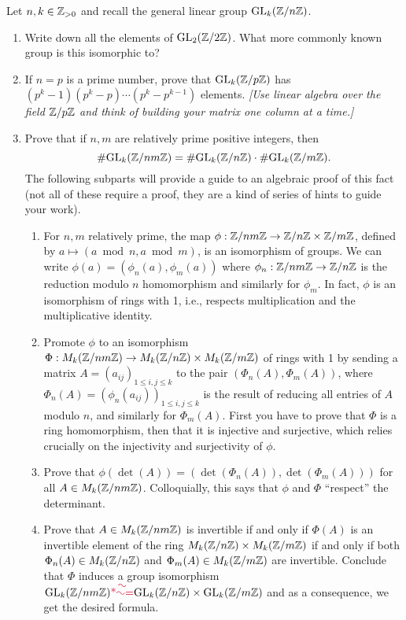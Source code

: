 \documentclass[11pt]{amsart}
\newcounter{problem}
\begin{document}
\begin{problem}
Let $n,k \in \mathbb{Z}_{>0}$ and recall the general linear group $\mathrm{GL}_k(\mathbb{Z}/n\mathbb{Z})$.
\begin{enumerate}\setlength{\itemsep}{3mm}
\item Write down all the elements of $\mathrm{GL}_2(\mathbb{Z}/2\mathbb{Z})$.  What more
commonly known group is this isomorphic to?

\item If $n=p$ is a prime number, prove that $\mathrm{GL}_k(\mathbb{Z}/p\mathbb{Z})$ has
$(p^k-1)(p^k-p)\dotsm (p^k-p^{k-1})$ elements.  \emph{[Use linear
algebra over the field $\mathbb{Z}/p\mathbb{Z}$ and think of building your matrix one
column at a time.]}

\item Prove that if $n,m$ are relatively prime positive integers, then
\[
\# \mathrm{GL}_k(\mathbb{Z}/nm\mathbb{Z}) = \# \mathrm{GL}_k(\mathbb{Z}/n\mathbb{Z}) \cdot \# \mathrm{GL}_k(\mathbb{Z}/m\mathbb{Z}).  
\]
The following subparts will provide a guide to an algebraic proof of
this fact (not all of these require a proof, they are a kind of series
of hints to guide your work).

\begin{enumerate}\setlength{\itemsep}{3mm}
\item For $n,m$ relatively prime, the map $\phi : \mathbb{Z}/nm\mathbb{Z} \to \mathbb{Z}/n\mathbb{Z}
\times \mathbb{Z}/m\mathbb{Z}$, defined by $a \mapsto (a \bmod n, a \bmod m)$, is an isomorphism of groups.  We can
write $\phi(a) = (\phi_n(a),\phi_m(a))$ where $\phi_n : \mathbb{Z}/nm\mathbb{Z} \to
\mathbb{Z}/n\mathbb{Z}$ is the reduction modulo $n$ homomorphism and similarly for
$\phi_m$.  In fact, $\phi$ is an isomorphism of rings with 1, i.e.,
respects multiplication and the multiplicative identity.

  \item Promote $\phi$ to an isomorphism $\Phi : M_k(\mathbb{Z}/nm\mathbb{Z}) \to
    M_k(\mathbb{Z}/n\mathbb{Z}) \times M_k(\mathbb{Z}/m\mathbb{Z})$ of rings with 1 by sending a
    matrix $A = (a_{ij})_{1 \leq i,j \leq k}$ to the
    pair $(\Phi_n(A), \Phi_m(A))$, where $\Phi_n(A) =
    (\phi_n(a_{ij}))_{1\leq i,j\leq k}$ is the result of reducing all
    entries of $A$ modulo $n$, and similarly for $\Phi_m(A)$.  First
    you have to prove that $\Phi$ is a ring homomorphism, then that it
    is injective and surjective, which relies crucially on the
    injectivity and surjectivity of $\phi$.

\item Prove that $\phi(\det(A)) = (\det(\Phi_n(A)), \det(\Phi_m(A)))$ for all $A \in M_k(\mathbb{Z}/nm\mathbb{Z})$.  Colloquially, this says that
  $\phi$ and $\Phi$ ``respect'' the determinant.

\item Prove that $A \in M_k(\mathbb{Z}/nm\mathbb{Z})$ is invertible if and only if
  $\Phi(A)$ is an invertible element of the ring $M_k(\mathbb{Z}/n\mathbb{Z}) \times M_k(\mathbb{Z}/m\mathbb{Z})$ if and
  only if both $\Phi_n(A) \in M_k(\mathbb{Z}/n\mathbb{Z})$ and $\Phi_m(A) \in
  M_k(\mathbb{Z}/m\mathbb{Z})$ are invertible.  Conclude that $\Phi$ induces a group
  isomorphism $\GL_k(\Z/nm\Z) \crim{\isom} \GL_k(\Z/n\Z) \times
  \GL_k(\Z/m\Z)$ and as a consequence, we get the desired formula.
\end{enumerate}


\end{enumerate}
\end{problem}
\end{document}
